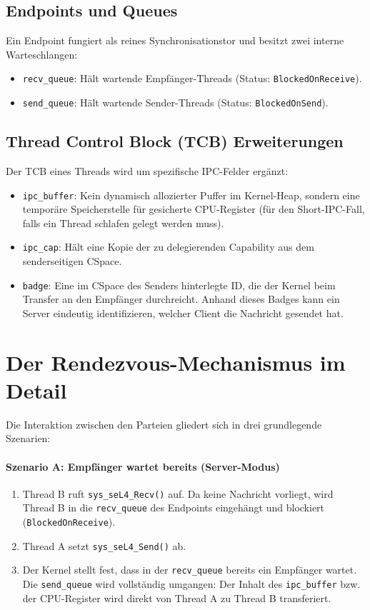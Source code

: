 \subsection{Endpoints und Queues}

Ein Endpoint fungiert als reines Synchronisationstor und besitzt zwei interne Warteschlangen:

\begin{itemize}
    \item \texttt{recv\_queue}: Hält wartende Empfänger-Threads (Status: \texttt{BlockedOnReceive}).
    \item \texttt{send\_queue}: Hält wartende Sender-Threads (Status: \texttt{BlockedOnSend}).
\end{itemize}

\subsection{Thread Control Block (TCB) Erweiterungen}

Der TCB eines Threads wird um spezifische IPC-Felder ergänzt:

\begin{itemize}
    \item \texttt{ipc\_buffer}: Kein dynamisch allozierter Puffer im Kernel-Heap, sondern eine temporäre Speicherstelle für gesicherte CPU-Register (für den Short-IPC-Fall, falls ein Thread schlafen gelegt werden muss).
    \item \texttt{ipc\_cap}: Hält eine Kopie der zu delegierenden Capability aus dem senderseitigen CSpace.
    \item \texttt{badge}: Eine im CSpace des Senders hinterlegte ID, die der Kernel beim Transfer an den Empfänger durchreicht. Anhand dieses Badges kann ein Server eindeutig identifizieren, welcher Client die Nachricht gesendet hat.
\end{itemize}

\section{Der Rendezvous-Mechanismus im Detail}

Die Interaktion zwischen den Parteien gliedert sich in drei grundlegende Szenarien:

\paragraph{Szenario A: Empfänger wartet bereits (Server-Modus)}
\begin{enumerate}
    \item Thread B ruft \texttt{sys\_seL4\_Recv()} auf. Da keine Nachricht vorliegt, wird Thread B in die \texttt{recv\_queue} des Endpoints eingehängt und blockiert (\texttt{BlockedOnReceive}).
    \item Thread A setzt \texttt{sys\_seL4\_Send()} ab.
    \item Der Kernel stellt fest, dass in der \texttt{recv\_queue} bereits ein Empfänger wartet. Die \texttt{send\_queue} wird vollständig umgangen: Der Inhalt des \texttt{ipc\_buffer} bzw. der CPU-Register wird direkt von Thread A zu Thread B transferiert.
\end{enumerate}

